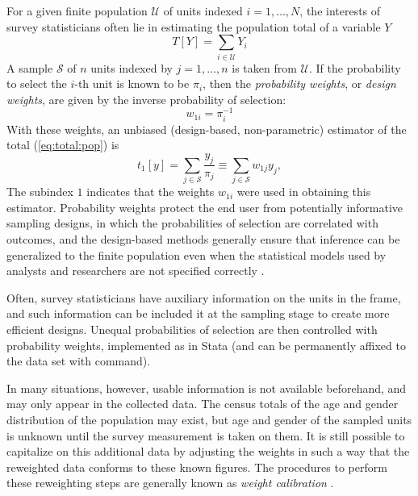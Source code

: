 For a given finite population $\mathcal U$ of units indexed $i=1,\ldots,N$,
the interests of survey statisticians often lie in estimating the
population total of a variable $Y$
\begin{equation}
   T[Y] = \sum_{i \in \mathcal{U}} Y_i
   \label{eq:total:pop}
\end{equation}
A sample $\mathcal S$ of $n$ units indexed by $j=1,\ldots,n$
is taken from $\mathcal U$. If the probability to select the
$i$-th unit is known to be $\pi_i$, then
the {\it probability weights}, or {\it design weights}, are given by
the inverse probability of selection:
\begin{equation}
   w_{1i} = \pi_i^{-1}
   \label{eq:prob:weight}
\end{equation}
With these weights, an unbiased
(design-based, non-parametric) estimator
of the total (\ref{eq:total:pop}) is \citep{horvitz:thompson:1952}
\begin{equation}
   t_{1}[y] = \sum_{j \in \mathcal{S}} \frac{y_j}{\pi_j}
   \equiv \sum_{j \in \mathcal{S}} w_{1j} y_j
   \label{eq:total:sample},
\end{equation}
The subindex $1$ indicates that the weights $w_{1i}$ were
used in obtaining this estimator. Probability weights protect
the end user from potentially informative sampling designs, in which
the probabilities of selection are correlated with outcomes, and
the design-based methods generally ensure that inference can be generalized
to the finite population even when the statistical models used
by analysts and researchers are not specified correctly
\citep{pfeff:1993,binder:roberts:2003}.

Often, survey statisticians have auxiliary information on the units
in the frame, and such information can be included it at the sampling stage
to create more efficient designs. Unequal probabilities of selection
are then controlled with probability weights, implemented
as \stcmd{[pw=}{\it exp}\stcmd{]} in Stata (and can be permanently
affixed to the data set with  command).

In many situations, however, usable information is not available beforehand,
and may only appear in the collected data. The census totals of the age and gender
distribution of the population may exist, but age and gender of
the sampled units is unknown until the survey measurement is taken on them.
It is still possible to capitalize on this additional data by
adjusting the weights in such a way that the reweighted data
conforms to these known figures. The procedures to perform these
reweighting steps are generally known as {\it weight calibration}
\citep{deville:sarndal:1992,deville:sarndal:sautory:1993,%
kott:2006,kott:2009,sarndal:2007}.

